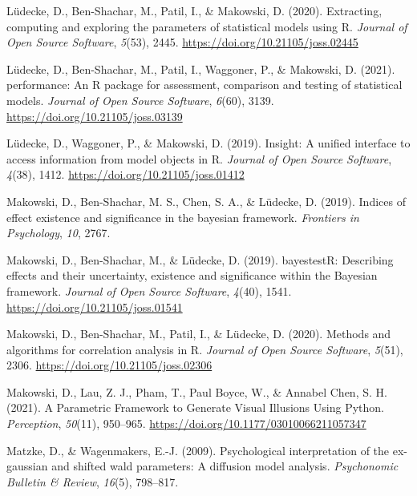 \documentclass[
  man,floatsintext]{apa6}
\newlength{\cslhangindent}
\newlength{\cslentryspacingunit} %
\newenvironment{CSLReferences}[2] %
 {%
  \setlength{\parindent}{0pt}
  \ifodd #1
  \let\oldpar\par
  \def\par{\hangindent=\cslhangindent\oldpar}
  \fi
  \setlength{\parskip}{#2\cslentryspacingunit}
 }%
 {}
\begin{document}
\begin{CSLReferences}{1}{0}
\leavevmode{}%
Lüdecke, D., Ben-Shachar, M., Patil, I., \& Makowski, D. (2020). Extracting, computing and exploring the parameters of statistical models using {R}. \emph{Journal of Open Source Software}, \emph{5}(53), 2445. \url{https://doi.org/10.21105/joss.02445}

\leavevmode{}%
Lüdecke, D., Ben-Shachar, M., Patil, I., Waggoner, P., \& Makowski, D. (2021). {performance}: An {R} package for assessment, comparison and testing of statistical models. \emph{Journal of Open Source Software}, \emph{6}(60), 3139. \url{https://doi.org/10.21105/joss.03139}

\leavevmode{}%
Lüdecke, D., Waggoner, P., \& Makowski, D. (2019). Insight: A unified interface to access information from model objects in {R}. \emph{Journal of Open Source Software}, \emph{4}(38), 1412. \url{https://doi.org/10.21105/joss.01412}

\leavevmode{}%
Makowski, D., Ben-Shachar, M. S., Chen, S. A., \& Lüdecke, D. (2019). Indices of effect existence and significance in the bayesian framework. \emph{Frontiers in Psychology}, \emph{10}, 2767.

\leavevmode{}%
Makowski, D., Ben-Shachar, M., \& Lüdecke, D. (2019). {bayestestR}: Describing effects and their uncertainty, existence and significance within the {Bayesian} framework. \emph{Journal of Open Source Software}, \emph{4}(40), 1541. \url{https://doi.org/10.21105/joss.01541}

\leavevmode{}%
Makowski, D., Ben-Shachar, M., Patil, I., \& Lüdecke, D. (2020). Methods and algorithms for correlation analysis in {R}. \emph{Journal of Open Source Software}, \emph{5}(51), 2306. \url{https://doi.org/10.21105/joss.02306}

\leavevmode{}%
Makowski, D., Lau, Z. J., Pham, T., Paul Boyce, W., \& Annabel Chen, S. H. (2021). A Parametric Framework to Generate Visual Illusions Using Python. \emph{Perception}, \emph{50}(11), 950--965. \url{https://doi.org/10.1177/03010066211057347}

\leavevmode{}%
Matzke, D., \& Wagenmakers, E.-J. (2009). Psychological interpretation of the ex-gaussian and shifted wald parameters: A diffusion model analysis. \emph{Psychonomic Bulletin \& Review}, \emph{16}(5), 798--817.


\end{CSLReferences}
\end{document}
